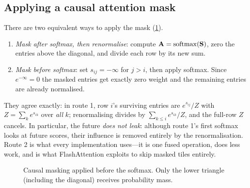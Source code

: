\subsection{Applying a causal attention mask}
There are two equivalent ways to apply the mask (\cref{fig:attention:mask}).
\begin{enumerate}
  \item \emph{Mask after softmax, then renormalise}: compute $\mathbf{A}=\operatorname{softmax}(\mathbf{S})$, zero the entries
  above the diagonal, and divide each row by its new sum.
  \item \emph{Mask before softmax}: set $s_{ij}=-\infty$ for $j>i$, then apply softmax. Since
  $e^{-\infty}=0$ the masked entries get exactly zero weight and the remaining entries are already
  normalised.
\end{enumerate}
They agree exactly: in route 1, row $i$'s surviving entries are
$e^{s_{ij}}/Z$ with $Z=\sum_{k} e^{s_{ik}}$ over \emph{all} $k$; renormalising divides by
$\sum_{k\le i}e^{s_{ik}}/Z$, and the full-row $Z$ cancels. In particular, the future \emph{does not
leak}: although route 1's first softmax looks at future scores, their influence is removed entirely
by the renormalisation. Route 2 is what every implementation uses---it is one fused
operation, does less work, and is what FlashAttention exploits to skip masked tiles entirely.

\begin{figure}[t]
\centering
{}
\caption{Causal masking applied before the softmax. Only the lower triangle (including the
diagonal) receives probability mass.}
\label{fig:attention:mask}
\end{figure}

